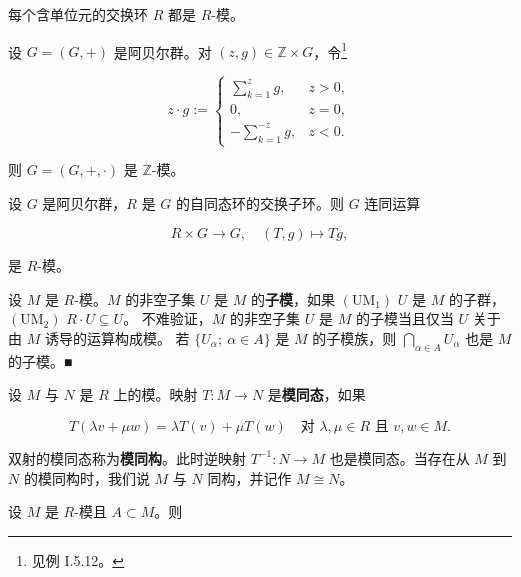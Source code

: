 \begin{example}

\begin{items}
\item

每个含单位元的交换环 $ R $ 都是 $ R $-模。

\item

设 $ G = (G,+) $ 是阿贝尔群。对 $ (z,g) \in \mathbb{Z}\times G $，令\footnote{见例 I.5.12。}

\begin{equation*}
z\cdot g := \begin{cases} \sum_{k=1}^{z}g , & z > 0 , \\ 0 , & z = 0 , \\ -\sum_{k=1}^{-z}g , & z < 0 . \end{cases}
\end{equation*}

则 $ G = (G,+,\cdot) $ 是 $ \mathbb{Z} $-模。

\item

设 $ G $ 是阿贝尔群，$ R $ 是 $ G $ 的自同态环的交换子环。则 $ G $ 连同运算

\[
R\times G \to G , \quad (T,g) \mapsto Tg ,
\]

是 $ R $-模。

\item

设 $ M $ 是 $ R $-模。$ M $ 的非空子集 $ U $ 是 $ M $ 的\textbf{子模}，如果
$ (\mathrm{UM}_{1}) $ $ U $ 是 $ M $ 的子群，
$ (\mathrm{UM}_{2}) $ $ R\cdot U \subseteq U $。
不难验证，$ M $ 的非空子集 $ U $ 是 $ M $ 的子模当且仅当 $ U $ 关于由 $ M $ 诱导的运算构成模。
若 $ \{U_{\alpha} ; \ \alpha \in A\} $ 是 $ M $ 的子模族，则 $ \bigcap_{\alpha\in A}U_{\alpha} $ 也是 $ M $ 的子模。\nobreak\hspace{0.35em}■

\end{items}

设 $ M $ 与 $ N $ 是 $ R $ 上的模。映射 $ T : M \to N $ 是\textbf{模同态}，如果

\[
T(\lambda v + \mu w) = \lambda T(v) + \mu T(w) \quad \text{对 } \lambda,\mu \in R \text{ 且 } v,w \in M .
\]

双射的模同态称为\textbf{模同构}。此时逆映射 $ T^{-1} : N \to M $ 也是模同态。当存在从 $ M $ 到 $ N $ 的模同构时，我们说 $ M $ 与 $ N $ 同构，并记作 $ M \cong N $。

设 $ M $ 是 $ R $-模且 $ A \subset M $。则


\end{example}

